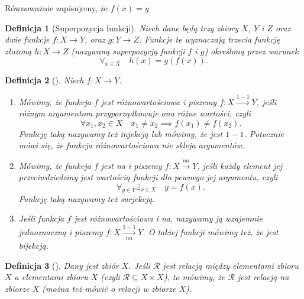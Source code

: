 \documentclass[12pt,a4paper]{report}
\newtheorem{definition}{Definicja}[chapter]
\begin{document}
Równoważnie zapisujemy, że $f(x)=y$

\begin{definition}[Superpozycja funkcji{\citep[Sec 4.2 Def. 1.]{kuratowski1966wstkep}}]
Niech dane będą trzy zbiory $X$, $Y$ i $Z$ oraz dwie funkcje $f:X\to Y$, oraz $g:Y\to Z$. Funkcje te wyznaczają trzecia funkcję złożoną $h:X\to Z$ (nazywaną superpozycją funkcji $f$ i $g$) określoną przez warunek
\begin{equation*}
\forall_{x \in X} \quad h(x)=g(f(x)).
\end{equation*}
\end{definition}

\begin{definition}[{\citep[Sec 5.2 Def. 5.5]{kraszewski2007wstkep}}]
Niech $f:X \to Y$.
\begin{enumerate}
\item
Mówimy, że funkcja $f$ jest różnowartościowa i piszemy $f:X\xrightarrow{1-1} Y$, jeśli różnym argumentom przyporządkowuje ona różne wartości, czyli
\begin{equation*}
\forall{x_{1},x_{2}}\in X \quad x_{1}\ne x_{2} \implies f(x_{1})\ne f(x_{2}).
\end{equation*}
Funkcję taką nazywamy też injekcją lub mówimy, że jest $1-1$. Potocznie mówi się, że funkcja różnowartościowa nie skleja argumentów.
\item
Mówimy, że funkcja $f$ jest na i piszemy $f:X\xrightarrow{na}Y$, jeśli każdy element jej przeciwdziedziny jest wartością funkcji dla pewnego jej argumentu, czyli
\begin{equation*}
\forall_{y\in Y} \exists_{x\in X} \quad y=f(x).
\end{equation*}
Funkcję taką nazywamy też surjekcją.
\item
Jeśli funkcja $f$ jest różnowartościowa i na, nazywamy ją wzajemnie jednoznaczną i piszemy $f:X\xrightarrow[na]{1-1} Y$. O takiej funkcji mówimy też, że jest bijekcją.
\end{enumerate}
\end{definition}

\begin{definition}[{\citep[Sec 6.1 Def. 6.2]{kraszewski2007wstkep}}]
Dany jest zbiór $X$. Jeśli $\mathcal{R}$ jest relacją między elementami zbioru $X$ a elementami zbioru $X$ (czyli $\mathcal{R}\subseteq X \times X$), to mówimy, że $\mathcal{R}$ jest relacją na zbiorze $X$ (można też mówić o relacji w zbiorze $X$).
\end{definition}
\end{document}
